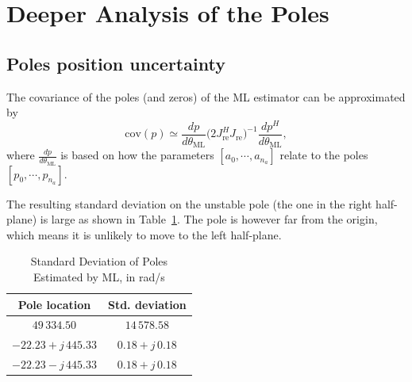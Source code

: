 \section{Deeper Analysis of the Poles}
\label{sec:polesAnalysis}

\subsection{Poles position uncertainty}

The covariance of the poles (and zeros) of the ML estimator can be approximated by
\begin{equation}
    \text{cov}(p) \simeq \frac{dp}{d\theta_{\text{ML}}} \Big(2 J_{\text{re}}^H J_{\text{re}}\Big)^{-1} \frac{dp^H}{d\theta_{\text{ML}}},
\end{equation}
where $\frac{dp}{d\theta_{\text{ML}}}$ is based on how the parameters $[a_0, \cdots, a_{n_a}]$ relate to the poles $[p_0, \cdots, p_{n_a}]$.

The resulting standard deviation on the unstable pole (the one in the right half-plane) is large as shown in Table~\ref{tab:pole_stddev}. The pole is however far from the origin, which means it is unlikely to move to the left half-plane.

\begin{table}
    \centering
    \caption{Standard Deviation of Poles Estimated by ML, in rad/s}
    \label{tab:pole_stddev}
    \begin{tabular}{c c}
    \hline
    \textbf{Pole location} & \textbf{Std. deviation} \\
    \hline
    $49\,334.50$ 
    & $14\,578.58$ \\

    $-22.23 + j\,445.33$ 
    & $0.18 + j\,0.18$ \\

    $-22.23 - j\,445.33$ 
    & $0.18 + j\,0.18$ \\
    \hline
    \end{tabular}
\end{table}



